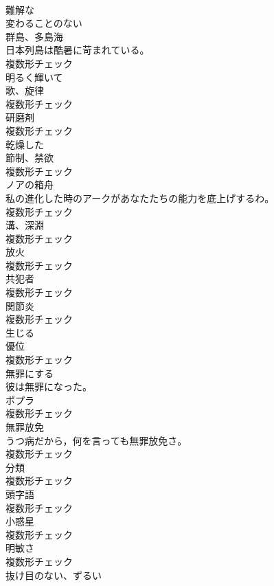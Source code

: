 \documentclass[8pt]{extreport}
\begin{document}
\begin{CJK}{UTF8}{min}
\\	[形容詞]	難解な	
\\	[形容詞]	変わることのない	
\\	[名詞]	群島、多島海	
\\	日本列島は酷暑に苛まれている。	
\\	複数形チェック
\\	[形容詞]	明るく輝いて	
\\	[名詞]	歌、旋律	
\\	複数形チェック
\\	[名詞]	研磨剤	
\\	複数形チェック
\\	[形容詞]	乾燥した	
\\	[名詞]	節制、禁欲	
\\	複数形チェック
\\	[名詞]	ノアの箱舟	
\\	私の進化した時のアークがあなたたちの能力を底上げするわ。	
\\	複数形チェック
\\	[名詞]	溝、深淵	
\\	複数形チェック
\\	[名詞]	放火	
\\	複数形チェック
\\	[名詞]	共犯者	
\\	複数形チェック
\\	[名詞]	関節炎	
\\	複数形チェック
\\	[動詞]	生じる	
\\	[名詞]	優位	
\\	複数形チェック
\\	[動詞]	無罪にする	
\\	彼は無罪になった。	
\\	[名詞]	ポプラ	
\\	複数形チェック
\\	[名詞]	無罪放免	
\\	うつ病だから，何を言っても無罪放免さ。	
\\	複数形チェック
\\	[名詞]	分類	
\\	複数形チェック
\\	[名詞]	頭字語	
\\	複数形チェック
\\	[名詞]	小惑星	
\\	複数形チェック
\\	[名詞]	明敏さ	
\\	複数形チェック
\\	[形容詞]	抜け目のない、ずるい	

\end{CJK}
\end{document}
